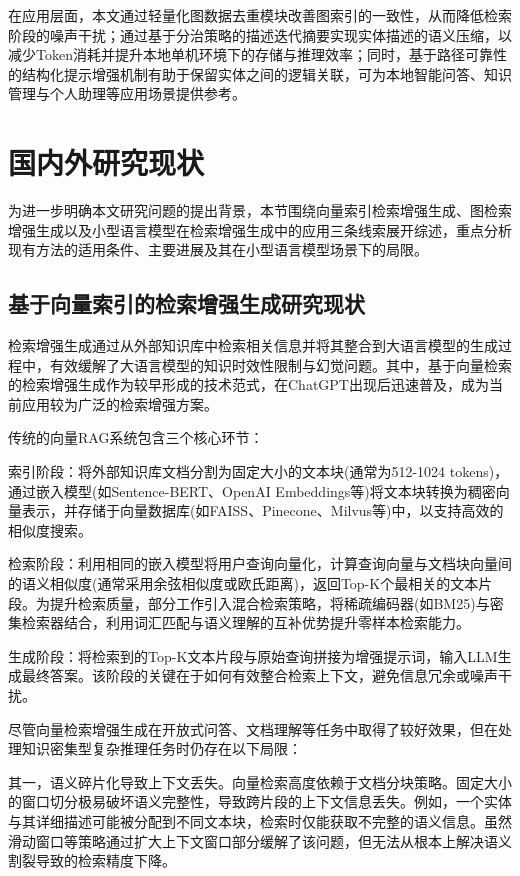 \documentclass[promaster, vlined]{DissertUESTC}
\begin{document}
在应用层面，本文通过轻量化图数据去重模块改善图索引的一致性，从而降低检索阶段的噪声干扰；通过基于分治策略的描述迭代摘要实现实体描述的语义压缩，以减少Token消耗并提升本地单机环境下的存储与推理效率；同时，基于路径可靠性的结构化提示增强机制有助于保留实体之间的逻辑关联，可为本地智能问答、知识管理与个人助理等应用场景提供参考。


\section{国内外研究现状}

为进一步明确本文研究问题的提出背景，本节围绕向量索引检索增强生成、图检索增强生成以及小型语言模型在检索增强生成中的应用三条线索展开综述，重点分析现有方法的适用条件、主要进展及其在小型语言模型场景下的局限。


\subsection{基于向量索引的检索增强生成研究现状}

检索增强生成通过从外部知识库中检索相关信息并将其整合到大语言模型的生成过程中，有效缓解了大语言模型的知识时效性限制与幻觉问题\cite{lewis2020retrieval}。其中，基于向量检索的检索增强生成作为较早形成的技术范式，在ChatGPT\cite{ouyang2022training}出现后迅速普及，成为当前应用较为广泛的检索增强方案。

传统的向量RAG系统包含三个核心环节\cite{finardi2024chronicles}：

索引阶段：将外部知识库文档分割为固定大小的文本块(通常为512-1024 tokens)，通过嵌入模型(如Sentence-BERT\cite{reimers2019sentence}、OpenAI Embeddings等)将文本块转换为稠密向量表示，并存储于向量数据库(如FAISS\cite{johnson2019billion}、Pinecone、Milvus等)中，以支持高效的相似度搜索。

检索阶段：利用相同的嵌入模型将用户查询向量化，计算查询向量与文档块向量间的语义相似度(通常采用余弦相似度或欧氏距离)，返回Top-K个最相关的文本片段\cite{karpukhin2020dense}。为提升检索质量，部分工作引入混合检索策略，将稀疏编码器(如BM25)与密集检索器结合，利用词汇匹配与语义理解的互补优势提升零样本检索能力。

生成阶段：将检索到的Top-K文本片段与原始查询拼接为增强提示词，输入LLM生成最终答案。该阶段的关键在于如何有效整合检索上下文，避免信息冗余或噪声干扰。

尽管向量检索增强生成在开放式问答、文档理解等任务中取得了较好效果，但在处理知识密集型复杂推理任务时仍存在以下局限：

其一，语义碎片化导致上下文丢失。向量检索高度依赖于文档分块策略。固定大小的窗口切分极易破坏语义完整性，导致跨片段的上下文信息丢失\cite{lewis2020retrieval}。例如，一个实体与其详细描述可能被分配到不同文本块，检索时仅能获取不完整的语义信息。虽然滑动窗口等策略通过扩大上下文窗口部分缓解了该问题，但无法从根本上解决语义割裂导致的检索精度下降。
\end{document}
